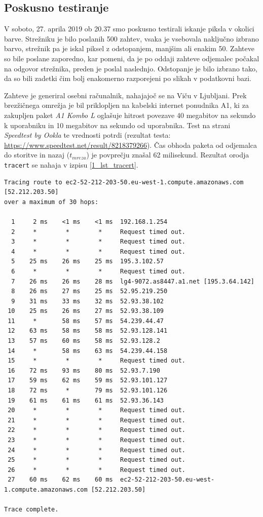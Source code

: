 \subsection{Poskusno testiranje}

V soboto, 27. aprila 2019 ob 20.37 smo poskusno testirali iskanje piksla v okolici barve.
Strežniku je bilo poslanih 500 zahtev, vsaka je vsebovala naključno izbrano barvo, strežnik pa je iskal piksel z odstopanjem, manjšim ali enakim 50.
Zahteve so bile poslane zaporedno, kar pomeni, da je po oddaji zahteve odjemalec počakal na odgovor strežnika, preden je poslal naslednjo.
Odstopanje je bilo izbrano tako, da so bili zadetki čim bolj enakomerno razporejeni po slikah v podatkovni bazi.

Zahteve je generiral osebni računalnik, nahajajoč se na Viču v Ljubljani.
Prek brezžičnega omrežja je bil priklopljen na kabelski internet ponudnika A1, ki za zakupljen paket \emph{A1 Kombo L} oglašuje hitrost povezave 40 megabitov na sekundo k uporabniku in 10 megabitov na sekundo od uporabnika.
Test na strani \emph{Speedtest by Ookla} te vrednosti potrdi (rezultat testa: \url{https://www.speedtest.net/result/8218379266}).
Čas obhoda paketa od odjemalca do storitve in nazaj ($t_{mreza}$) je povprečju znašal 62 milisekund.
Rezultat orodja \texttt{tracert} se nahaja v izpisu \ref{1_lst_tracert}.

\begin{lstlisting}[caption={Rezultat orodja \texttt{tracert}.},label={1_lst_tracert}]
Tracing route to ec2-52-212-203-50.eu-west-1.compute.amazonaws.com [52.212.203.50]
over a maximum of 30 hops:

  1     2 ms    <1 ms    <1 ms  192.168.1.254
  2     *        *        *     Request timed out.
  3     *        *        *     Request timed out.
  4     *        *        *     Request timed out.
  5    25 ms    26 ms    25 ms  195.3.102.57
  6     *        *        *     Request timed out.
  7    26 ms    26 ms    28 ms  lg4-9072.as8447.a1.net [195.3.64.142]
  8    26 ms    27 ms    25 ms  52.95.219.250
  9    31 ms    33 ms    32 ms  52.93.38.102
 10    25 ms    26 ms    27 ms  52.93.38.109
 11     *       58 ms    57 ms  54.239.44.47
 12    63 ms    58 ms    58 ms  52.93.128.141
 13    57 ms    60 ms    58 ms  52.93.128.2
 14     *       58 ms    63 ms  54.239.44.158
 15     *        *        *     Request timed out.
 16    72 ms    93 ms    80 ms  52.93.7.190
 17    59 ms    62 ms    59 ms  52.93.101.127
 18    72 ms     *       79 ms  52.93.101.126
 19    61 ms    61 ms    61 ms  52.93.36.143
 20     *        *        *     Request timed out.
 21     *        *        *     Request timed out.
 22     *        *        *     Request timed out.
 23     *        *        *     Request timed out.
 24     *        *        *     Request timed out.
 25     *        *        *     Request timed out.
 26     *        *        *     Request timed out.
 27    60 ms    62 ms    60 ms  ec2-52-212-203-50.eu-west-1.compute.amazonaws.com [52.212.203.50]

Trace complete.
\end{lstlisting}

